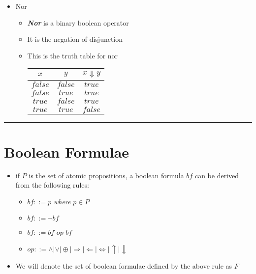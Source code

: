 \documentclass{article}
\begin{document}
\begin{itemize}
\begin{itemize}
\begin{center}
\begin{tabular}{ |c|c|c| }
      \end{tabular}
    \end{center}
  \end{itemize}
  \item{Nor}
  \begin{itemize}
    \item{\textbf{\textit{Nor}} is a binary boolean operator}
    \item{It is the negation of disjunction}
    \item{This is the truth table for nor} \\
    \begin{center}
      \begin{tabular}{ |c|c|c| }
        \hline
        $x$ & $y$ & $x \Downarrow y$ \\
        \hline
        $false$ & $false$ & $true$ \\
        $false$ & $true$ & $true$ \\
        $true$ & $false$ & $true$ \\
        $true$ & $true$ & $false$ \\
        \hline
      \end{tabular}
    \end{center}
  \end{itemize}
\end{itemize}

\begin{center}
  \rule{0.5\textwidth}{0.4pt}
\end{center}
\pagebreak

\section{Boolean Formulae}
\begin{itemize}
  \item{if $P$ is the set of atomic propositions, a boolean formula $bf$ can be derived from the following rules:}
  \begin{itemize}
    \item{$bf ::= p$ \textit{where} $p \in P$}
    \item{$bf ::= \neg{bf}$}
    \item{$bf ::= bf$ $op$ $bf$}
    \item{$op ::= \land|\lor|\oplus|\Rightarrow|\Leftarrow|\Leftrightarrow|\Uparrow|\Downarrow$}
  \end{itemize}
  \item{We will denote the set of boolean formulae defined by the above rule as $F$}
\end{itemize}
\end{document}
